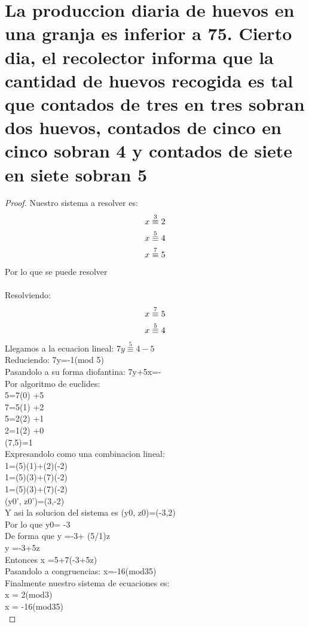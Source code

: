 \section{\large La produccion diaria de huevos en una granja es inferior a 75. Cierto dia, el recolector informa que la cantidad de huevos recogida es tal que contados de tres en tres sobran dos huevos, contados de cinco en cinco sobran 4 y contados de siete en siete sobran 5}

\begin{proof}
    Nuestro sistema a resolver es:\\
    \begin{align}
        \notag x \stackrel{3}{\equiv} 2\\
        \notag x \stackrel{5}{\equiv} 4\\
        \notag x \stackrel{7}{\equiv} 5\\
    \end{align}
    Por lo que se puede resolver\\ \\
    
    Resolviendo:\\
    \begin{align}
        \notag x \stackrel{7}{\equiv} 5\\
        \notag x \stackrel{5}{\equiv} 4\\
    \end{align}
    Llegamos a la ecuacion lineal: $7y\stackrel{5}{\equiv}4-5$\\
Reduciendo: 7y=-1(mod 5)\\
Pasandolo a su forma diofantina: 7y+5x=-\\
Por algoritmo de euclides: \\
5=7(0)  +5\\
7=5(1)  +2\\
5=2(2)  +1\\
2=1(2)  +0\\
(7,5)=1\\
Expresandolo como una combinacion lineal:\\
1=(5)(1)+(2)(-2)\\
1=(5)(3)+(7)(-2)\\
1=(5)(3)+(7)(-2)\\
(y0', z0')=(3,-2)\\
Y asi la solucion del sistema es (y0, z0)=(-3,2)\\
Por lo que y0= -3\\
De forma que y =-3+ (5/1)z\\
y =-3+5z\\
Entonces x =5+7(-3+5z)\\
Pasandolo a congruencias: x=-16(mod35)\\
Finalmente nuestro sistema de ecuaciones es:\\
x = 2(mod3)\\
x = -16(mod35)\\



\end{proof}
